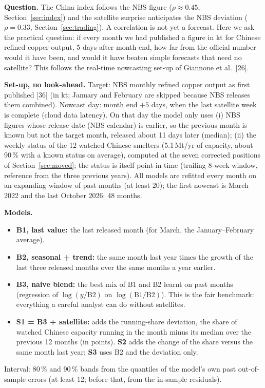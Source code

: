 \documentclass[10pt,a4paper]{article}
\begin{document}
\textbf{Question.} The China index follows the NBS figure ($\rho\approx0.45$, Section~\ref{sec:index}) and the satellite surprise anticipates the NBS deviation ($\rho=0.33$, Section~\ref{sec:trading}). A correlation is not yet a forecast. Here we ask the practical question: if every month we had published a figure in kt for Chinese refined copper output, 5 days after month end, how far from the official number would it have been, and would it have beaten simple forecasts that need no satellite? This follows the real-time nowcasting set-up of Giannone et al.\ [26].

\textbf{Set-up, no look-ahead.} Target: NBS monthly refined copper output as first published [36] (in kt; January and February are skipped because NBS releases them combined). Nowcast day: month end $+5$ days, when the last satellite week is complete (cloud data latency). On that day the model only uses (i) NBS figures whose release date (NBS calendar) is earlier, so the previous month is known but not the target month, released about 11 days later (median); (ii) the weekly status of the 12 watched Chinese smelters (5.1\,Mt/yr of capacity, about 90\,\% with a known status on average), computed at the seven corrected positions of Section~\ref{sec:moved}; the status is itself point-in-time (trailing 8-week window, reference from the three previous years). All models are refitted every month on an expanding window of past months (at least 20); the first nowcast is March 2022 and the last October 2026: 48 months.

\textbf{Models.}
\begin{itemize}[leftmargin=1.2em]
  \item \textbf{B1, last value:} the last released month (for March, the January--February average).
  \item \textbf{B2, seasonal + trend:} the same month last year times the growth of the last three released months over the same months a year earlier.
  \item \textbf{B3, naive blend:} the best mix of B1 and B2 learnt on past months (regression of $\log(y/\mathrm{B2})$ on $\log(\mathrm{B1}/\mathrm{B2})$). This is the fair benchmark: everything a careful analyst can do without satellites.
  \item \textbf{S1 = B3 + satellite:} adds the running-share deviation, the share of watched Chinese capacity running in the month minus its median over the previous 12 months (in points). \textbf{S2} adds the change of the share versus the same month last year; \textbf{S3} uses B2 and the deviation only.
\end{itemize}
Interval: 80\,\% and 90\,\% bands from the quantiles of the model's own past out-of-sample errors (at least 12; before that, from the in-sample residuals).
\end{document}
